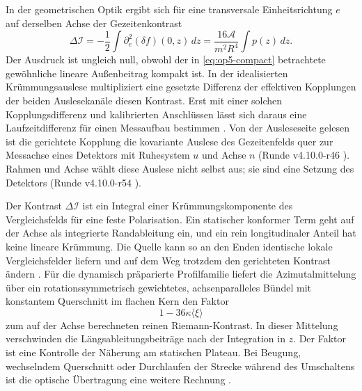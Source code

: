 

In der geometrischen Optik ergibt sich für eine transversale Einheitsrichtung \(e\) auf derselben Achse der Gezeitenkontrast
\begin{equation}
 \Delta\mathcal I=-\frac12\int\partial_e^2(\delta f)(0,z)\,dz
                 =\frac{16\mathcal A}{m^2R^4}\int p(z)\,dz .
 \label{eq:op5-contrast}
\end{equation}
Der Ausdruck ist ungleich null, obwohl der in \eqref{eq:op5-compact} betrachtete gewöhnliche lineare Außenbeitrag kompakt ist. In der idealisierten Krümmungsauslese multipliziert eine gesetzte Differenz der effektiven Kopplungen der beiden Auslesekanäle diesen Kontrast. Erst mit einer solchen Kopplungsdifferenz und kalibrierten Anschlüssen lässt sich daraus eine Laufzeitdifferenz für einen Messaufbau bestimmen \cite{op5-axis,op5-motion}. Von der Ausleseseite gelesen ist die gerichtete Kopplung die kovariante Auslese des Gezeitenfelds quer zur Messachse eines Detektors mit Ruhesystem \(u\) und Achse \(n\) (Runde v4.10.0-r46 \cite{layers}). Rahmen und Achse wählt diese Auslese nicht selbst aus; sie sind eine Setzung des Detektors (Runde v4.10.0-r54 \cite{layers}).

Der Kontrast \(\Delta\mathcal I\) ist ein Integral einer Krümmungskomponente des Vergleichsfelds für eine feste Polarisation. Ein statischer konformer Term geht auf der Achse als integrierte Randableitung ein, und ein rein longitudinaler Anteil hat keine lineare Krümmung. Die Quelle kann so an den Enden identische lokale Vergleichsfelder liefern und auf dem Weg trotzdem den gerichteten Kontrast ändern \cite{op5-axis}. Für die dynamisch präparierte Profilfamilie liefert die Azimutalmittelung über ein rotationssymmetrisch gewichtetes, achsenparalleles Bündel mit konstantem Querschnitt im flachen Kern den Faktor
\begin{equation}
 1-36\kappa\langle\xi\rangle
 \label{eq:op5-beam}
\end{equation}
zum auf der Achse berechneten reinen Riemann-Kontrast. In dieser Mittelung verschwinden die Längsableitungsbeiträge nach der Integration in \(z\). Der Faktor ist eine Kontrolle der Näherung am statischen Plateau. Bei Beugung, wechselndem Querschnitt oder Durchlaufen der Strecke während des Umschaltens ist die optische Übertragung eine weitere Rechnung \cite{op5-motion,op5-axis}.

